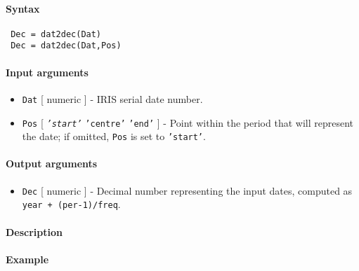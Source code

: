 


	\paragraph{Syntax}
 
 \begin{verbatim}
 Dec = dat2dec(Dat)
 Dec = dat2dec(Dat,Pos)
 \end{verbatim}
 
 \paragraph{Input arguments}
 
 \begin{itemize}
 \item
   \texttt{Dat} {[} numeric {]} - IRIS serial date number.
 \item
   \texttt{Pos} {[} \emph{\texttt{'start'}} \textbar{} \texttt{'centre'}
   \textbar{} \texttt{'end'} {]} - Point within the period that will
   represent the date; if omitted, \texttt{Pos} is set to
   \texttt{'start'}.
 \end{itemize}
 
 \paragraph{Output arguments}
 
 \begin{itemize}
 \item
   \texttt{Dec} {[} numeric {]} - Decimal number representing the input
   dates, computed as \texttt{year + (per-1)/freq}.
 \end{itemize}
 
 \paragraph{Description}
 
 \paragraph{Example}



